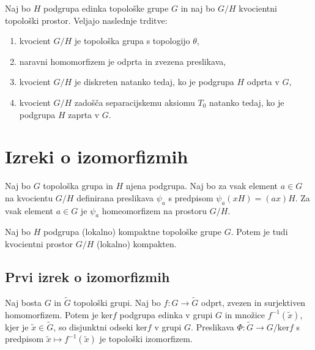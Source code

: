 \documentclass[mat1]{fmfdelo}
\begin{document}
\begin{izrek}\label{izr:kvocpovzetek}
Naj bo $H$ podgrupa edinka topološke grupe $G$ in naj bo $G/H$ kvocientni topološki prostor. Veljajo naslednje trditve:
\begin{enumerate}
\item kvocient $G/H$ je topološka grupa s topologijo $\theta$,
\item naravni homomorfizem je odprta in zvezena preslikava,
\item kvocient $G/H$ je diskreten natanko tedaj, ko je podgrupa $H$ odprta v $G$,
\item kvocient $G/H$ zadošča separacijskemu aksiomu $T_0$ natanko tedaj, ko je pod\-gru\-pa $H$ zaprta v $G$.
\end{enumerate}
\end{izrek}

\section{Izreki o izomorfizmih}

\begin{trditev}\label{trd:homogenkvoc}
	Naj bo $G$ topološka grupa in $H$ njena podgrupa. Naj bo za vsak element $a \in G$ na kvocientu $G/H$ definirana preslikava $\psi_a$ s predpisom $\psi_a(xH) = (ax)H$.
	Za vsak element $a \in G$ je $\psi_a$ homeomorfizem na prostoru $G/H$.
\end{trditev}

\begin{trditev}\label{trd:kvockompakt}
	Naj bo $H$ podgrupa (lokalno) kompaktne topološke grupe $G$. Potem je tudi kvocientni prostor $G/H$ (lokalno) kompakten.
\end{trditev}

\subsection{Prvi izrek o izomorfizmih}
\begin{izrek}\label{izr:prvitopizrek}
Naj bosta $G$ in $\widetilde{G}$ topološki grupi. Naj bo $f: G \to \widetilde{G}$ odprt, zvezen in surjektiven homomorfizem. Potem je ker$f$ podgrupa edinka v grupi $G$ in množice $f^{-1}(\tilde{x})$, kjer je $\tilde{x} \in \widetilde{G}$, so disjunktni odseki ker$f$ v grupi $G$. Preslikava $\Phi:\widetilde{G} \to G/\text{ker}f$ s predpisom $\tilde{x} \mapsto f^{-1}(\tilde{x})$ je topološki izomorfizem.
\end{izrek}
\end{document}
